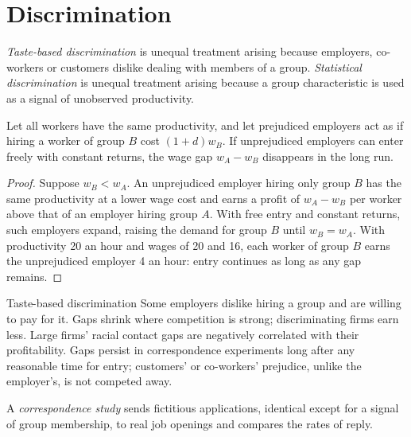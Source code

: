 \section{Discrimination}\label{sec:b3:wage-structure:discrimination}

\begin{definition}\label{def:b3:wage-structure:discrimination}
\emph{Taste-based discrimination} is unequal treatment arising because employers,
co-workers or customers dislike dealing with members of a group. \emph{Statistical
discrimination} is unequal treatment arising because a group characteristic is
used as a signal of unobserved productivity.
\end{definition}

\begin{proposition}\label{prop:b3:wage-structure:becker}
Let all workers have the same productivity, and let prejudiced employers act as if
hiring a worker of group $B$ cost $(1 + d)w_B$. If unprejudiced employers can enter freely
with constant returns, the wage gap $w_A - w_B$ disappears in the long run.
\end{proposition}

\begin{proof}
Suppose $w_B < w_A$. An unprejudiced employer hiring only group $B$ has the same productivity
at a lower wage cost and earns a profit of $w_A - w_B$ per worker above that of an employer
hiring group $A$. With free entry and constant returns, such employers expand, raising
the demand for group $B$ until $w_B = w_A$. With productivity 20 an hour and wages of 20 and 16,
each worker of group $B$ earns the unprejudiced employer 4 an hour: entry continues as long
as any gap remains.
\end{proof}

\begin{model}{Taste-based discrimination}
\assumes Some employers dislike hiring a group and are willing to pay for it.
\predicts Gaps shrink where competition is strong; discriminating firms earn less.
\tested Large firms' racial contact gaps are negatively correlated with their
profitability. %
\breaks Gaps persist in correspondence experiments long after any reasonable
time for entry; customers' or co-workers' prejudice, unlike the employer's, is not
competed away.
\end{model}

\begin{definition}\label{def:b3:wage-structure:audit}
A \emph{correspondence study} sends fictitious applications, identical except for a
signal of group membership, to real job openings and compares the rates of reply.
\end{definition}

